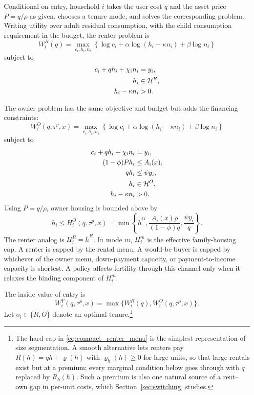 \documentclass[11pt]{article}
\newcommand{\1}{\mathbf 1}
\newcommand{\HH}{\mathcal H}
\begin{document}
Conditional on entry, household $i$ takes the user cost $q$ and the asset price $P=q/\rho$ as given, chooses a tenure mode, and solves the corresponding problem. Writing utility over adult residual consumption, with the child consumption requirement in the budget, the renter problem is
\begin{equation}
W_i^R(q)
=
\max_{c_i,h_i,n_i}
\left\{
\log c_i+\alpha\log(h_i-\kappa n_i)+\beta\log n_i
\right\}
\label{eq:compact_renter_problem}
\end{equation}
subject to
\begin{align}
c_i+q h_i+\chi_i n_i&=y_i,
\label{eq:compact_renter_budget}\\
h_i&\in\HH^R,
\label{eq:compact_renter_menu}\\
h_i-\kappa n_i&>0.
\notag
\end{align}

The owner problem has the same objective and budget but adds the financing constraints:
\begin{equation}
W_i^O(q,\tau^p,x)
=
\max_{c_i,h_i,n_i}
\left\{
\log c_i+\alpha\log(h_i-\kappa n_i)+\beta\log n_i
\right\}
\label{eq:compact_owner_problem_young}
\end{equation}
subject to
\begin{align}
c_i+q h_i+\chi_i n_i&=y_i,
\label{eq:compact_owner_budget_young}\\
(1-\phi)P h_i&\le A_i(x),
\label{eq:compact_owner_dp}\\
q h_i&\le \psi y_i,
\label{eq:compact_owner_pti}\\
h_i&\in\HH^O,
\notag\\
h_i-\kappa n_i&>0.
\notag
\end{align}
Using $P=q/\rho$, owner housing is bounded above by
\[
h_i\le
H_i^O(q,\tau^p,x)
=
\min\left\{
\bar h^O,
\frac{A_i(x)\rho}{(1-\phi)q},
\frac{\psi y_i}{q}
\right\}.
\]
The renter analog is $H_i^R=\bar h^R$. In mode $m$, $H_i^m$ is the effective family-housing cap. A renter is capped by the rental menu. A would-be buyer is capped by whichever of the owner menu, down-payment capacity, or payment-to-income capacity is shortest. A policy affects fertility through this channel only when it relaxes the binding component of $H_i^m$.

The inside value of entry is
\begin{equation}
W_i^Y(q,\tau^p,x)
=
\max\{W_i^R(q),W_i^O(q,\tau^p,x)\}.
\label{eq:compact_tenure_value}
\end{equation}
Let $o_i\in\{R,O\}$ denote an optimal tenure.\footnote{The hard cap in \eqref{eq:compact_renter_menu} is the simplest representation of size segmentation. A smooth alternative lets renters pay $R(h)=q h+\varrho(h)$ with $\varrho_h(h)\ge0$ for large units, so that large rentals exist but at a premium; every marginal condition below goes through with $q$ replaced by $R_h(h)$. Such a premium is also one natural source of a rent--own gap in per-unit costs, which Section~\ref{sec:switching} studies.}
\end{document}
